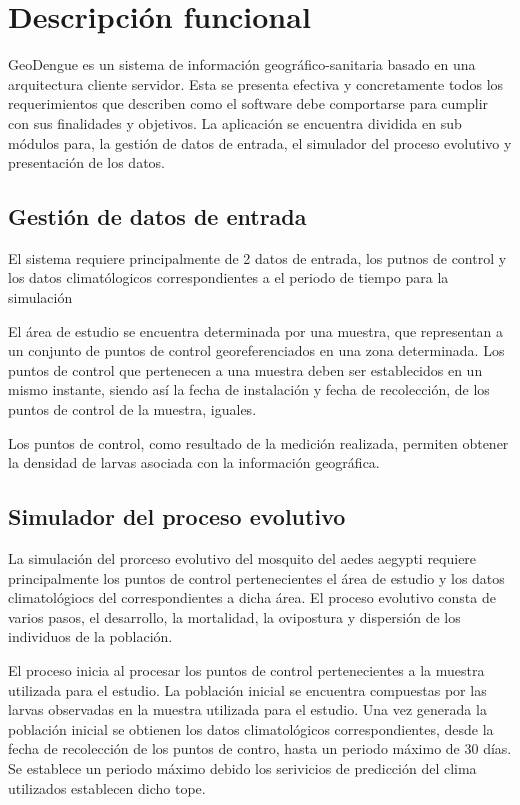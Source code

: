 \section{Descripción funcional}
GeoDengue es un sistema de información geográfico-sanitaria basado en una arquitectura cliente
servidor. Esta se presenta efectiva y concretamente todos los requerimientos que describen como el
software debe comportarse para cumplir con sus finalidades y objetivos. La aplicación se encuentra
dividida en sub módulos para, la gestión de datos de entrada, el simulador del proceso evolutivo y
presentación de los datos.


\subsection{Gestión de datos de entrada}
El sistema requiere principalmente de 2 datos de entrada, los putnos de control y los datos
climatólogicos correspondientes a el periodo de tiempo para la simulación

El área de estudio se encuentra determinada por una muestra, que representan a un conjunto de
puntos de control georeferenciados en una zona determinada. Los puntos de control que pertenecen a
una muestra deben ser establecidos en un mismo instante, siendo así la fecha de instalación y
fecha de recolección, de los puntos de control de la muestra, iguales.


Los puntos de control, como resultado de la medición realizada, permiten obtener la densidad de
larvas asociada con la información geográfica.
\subsection{Simulador del proceso evolutivo}

La simulación del prorceso evolutivo del mosquito del aedes aegypti requiere principalmente los
puntos de control pertenecientes el área de estudio y los datos climatológiocs del correspondientes
a dicha área. El proceso evolutivo consta de varios pasos, el desarrollo, la mortalidad,
la ovipostura y dispersión de los individuos de la población.

El proceso inicia al procesar los puntos de control pertenecientes a la muestra utilizada para el
estudio. La población inicial se encuentra compuestas por las larvas observadas en la muestra
utilizada para el estudio. Una vez generada la población inicial se obtienen los datos
climatológicos correspondientes, desde la fecha de recolección de los puntos de contro, hasta un
periodo máximo de 30 días. Se establece un periodo máximo debido los serivicios de predicción del
clima utilizados establecen dicho tope.

